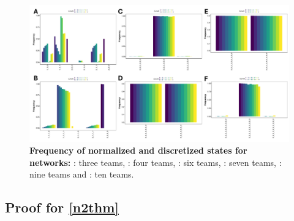\documentclass[11pt,a4paper]{article}
\theoremstyle{definition}
\theoremstyle{remark}
\begin{document}
\begin{figure}[h]
    \centering
    \begin{subfigure}[c]{\textwidth}
        \label{Team3-mlvl-ssfreq}
    \end{subfigure}
    \begin{subfigure}[c]{\textwidth}
        \label{Team4-mlvl-ssfreq}
    \end{subfigure}
    \begin{subfigure}[c]{\textwidth}
        \label{Team6-mlvl-ssfreq}
    \end{subfigure}
    \begin{subfigure}[c]{\textwidth}
        \label{Team7-mlvl-ssfreq}
    \end{subfigure}
    \begin{subfigure}[c]{\textwidth}
        \label{Team9-mlvl-ssfreq}
    \end{subfigure}
    \begin{subfigure}[c]{\textwidth}
        \label{Team10-mlvl-ssfreq}
    \end{subfigure}
    \includegraphics[width=\textwidth]{figures/FigureSZ} 
    \caption{\textbf{Frequency of normalized and discretized states for networks:} : three teams, : four teams, : six teams, : seven teams, : nine teams and : ten teams.}
    \label{multlvl-ssfreq}
\end{figure}

\clearpage

\subsection{Proof for \cref{n2thm}}
\end{document}
